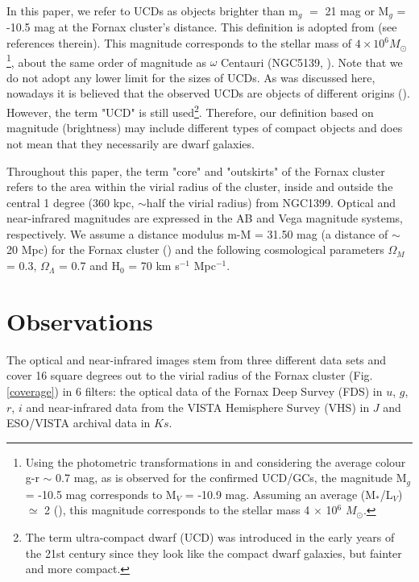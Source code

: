 \documentclass[fleqn,usenatbib]{mnras}
\begin{document}
In this paper, we refer to UCDs as objects brighter than m$_g$ $=$ 21 mag or M$_g$ = -10.5 mag at the Fornax cluster's distance. This definition is adopted from \citealp{Cantiello2020} (see references therein). This magnitude corresponds to the stellar mass of $4 \times 10^6 M_{\odot}$ \footnote{Using the photometric transformations in \citet{jester2005} and considering the average colour g-r $\sim$ 0.7 mag, as is observed for the confirmed UCD/GCs, the magnitude M$_g$ = -10.5 mag corresponds to M$_V$ = -10.9 mag. Assuming an average (M$_*$/L$_V$) $\simeq$ 2 (\citealp{kruij2008}), this magnitude corresponds to the stellar mass 4 $\times$ 10$^6$ $M_{\odot}$.}, about the same order of magnitude as $\omega$ Centauri (NGC5139, \citealp{dsouza,Baumgardt2018}). Note that we do not adopt any lower limit for the sizes of UCDs. As was discussed here, nowadays it is believed that the observed UCDs are objects of different origins (\citealp{Hilker2006}). However, the term "UCD" is still used\footnote{The term ultra-compact dwarf (UCD) was introduced in the early years of the 21st century since they look like the compact dwarf galaxies, but fainter and more compact.}. Therefore, our definition based on magnitude (brightness) may include different types of compact objects and does not mean that they necessarily are dwarf galaxies. 

Throughout this paper, the term "core" and "outskirts" of the Fornax cluster refers to the area within the virial radius of the cluster, inside and outside the central 1 degree (360 kpc, $\sim$half the virial radius) from NGC1399. Optical and near-infrared magnitudes are expressed in the AB and Vega magnitude systems, respectively. We assume a distance modulus m-M = 31.50 mag (a distance of $\sim$ 20 Mpc) for the Fornax cluster (\citealp{jerjen2003, Blakeslee2009}) and the following cosmological parameters $\Omega_{M}$ = 0.3, $\Omega_{\Lambda}$ = 0.7 and H$_{0}$ = 70 km s$^{-1}$ Mpc$^{-1}$. 

\section{Observations}
\label{sec2}
The optical and near-infrared images stem from three different data sets and cover 16 square degrees out to the virial radius of the Fornax cluster (Fig. \ref{coverage}) in 6 filters: the optical data of the Fornax Deep Survey (FDS) in $u$, $g$, $r$, $i$ and near-infrared data from the VISTA Hemisphere Survey (VHS) in $J$ and ESO/VISTA archival data in $Ks$.
\end{document}

